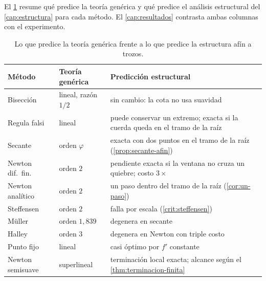 El \cref{tab:prediccion} resume qué predice la teoría genérica y qué predice el
análisis estructural del \cref{cap:estructura} para cada método. El
\cref{cap:resultados} contrasta ambas columnas con el experimento.

\begin{table}[H]
\centering
\caption[Predicciones teóricas]{Lo que predice la teoría genérica frente a lo que
predice la estructura afín a trozos.}
\label{tab:prediccion}
\small
\begin{tabular}{@{}p{3.4cm}p{4.6cm}p{6.2cm}@{}}
\toprule
\textbf{Método} & \textbf{Teoría genérica} & \textbf{Predicción estructural} \\
\midrule
Bisección & lineal, razón $1/2$ & sin cambio: la cota no usa suavidad \\
Regula falsi & lineal & puede conservar un extremo; exacta si la cuerda queda en el tramo de la raíz \\
Secante & orden $\varphi$ & exacta con dos puntos en el tramo de la raíz (\cref{prop:secante-afin}) \\
Newton dif.\ fin. & orden $2$ & pendiente exacta si la ventana no cruza un quiebre; costo $3\times$ \\
Newton analítico & orden $2$ & un paso dentro del tramo de la raíz (\cref{cor:un-paso}) \\
Steffensen & orden $2$ & falla por escala (\cref{crit:steffensen}) \\
Müller & orden $1{,}839$ & degenera en secante \\
Halley & orden $3$ & degenera en Newton con triple costo \\
Punto fijo & lineal & casi óptimo por $f'$ constante \\
Newton semisuave & superlineal & terminación local exacta; alcance según el \cref{thm:terminacion-finita} \\
\bottomrule
\end{tabular}
\end{table}
